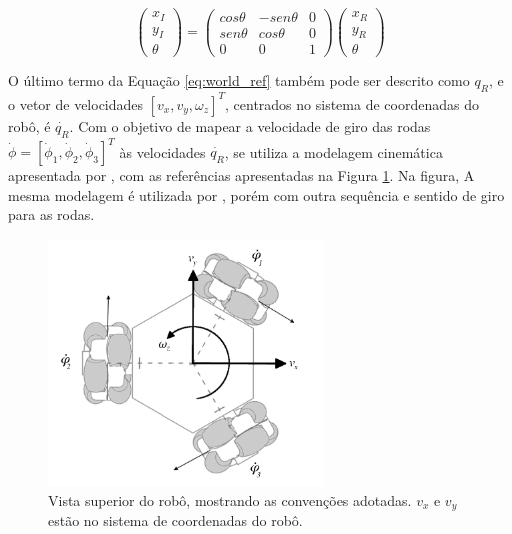 \begin{equation}
  \begin{pmatrix}
    x_I \\
    y_I \\
    \theta
  \end{pmatrix}
  =
  \begin{pmatrix}
    cos \theta & -sen \theta & 0 \\
    sen\theta  &  cos \theta & 0 \\
    0          & 0          & 1
  \end{pmatrix}
  \begin{pmatrix}
    x_R \\
    y_R \\
    \theta
  \end{pmatrix}
  \label{eq:world_ref}
\end{equation}

O último termo da Equação \ref{eq:world_ref} também pode ser descrito como $q_R$, e o vetor de velocidades $[v_x, v_y, \omega_z]^T$, centrados no sistema de coordenadas do robô, é $\dot{q_R}$. Com o objetivo de mapear a velocidade de giro das rodas $\dot{\phi} = [\dot{\phi}_1, \dot{\phi}_2, \dot{\phi}_3]^T$ às velocidades $\dot{q_R}$, se utiliza a modelagem cinemática apresentada por \cite{siegwart2011introduction}, com as referências apresentadas na Figura \ref{fig:robo_vel}. Na figura,  A mesma modelagem é utilizada por \cite{ritter2016modelagem}, porém com outra sequência e sentido de giro para as rodas.

\begin{figure}[h]
  \centering
  \includegraphics[width = 0.65\textwidth]{imagens/robot_vel4}
  \caption{Vista superior do robô, mostrando as convenções adotadas. $v_x$ e $v_y$ estão no sistema de coordenadas do robô.}
  \label{fig:robo_vel}
\end{figure}

